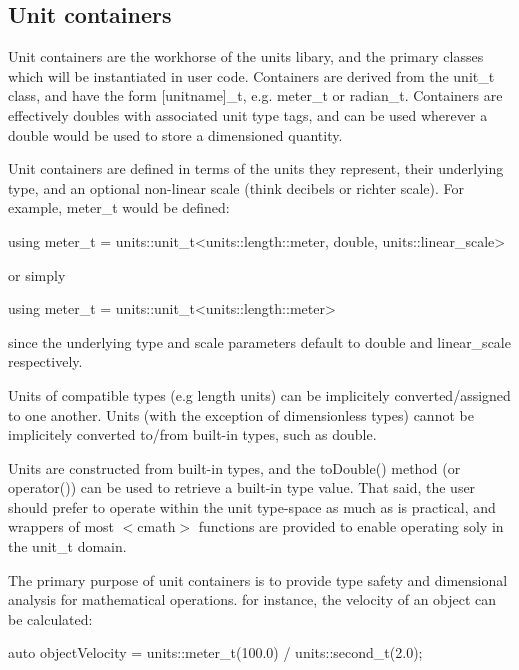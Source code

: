 \subsection*{Unit containers }

Unit containers are the workhorse of the units libary, and the primary classes which will be instantiated in user code. Containers are derived from the {\ttfamily unit\+\_\+t} class, and have the form {\ttfamily \mbox{[}unitname\mbox{]}\+\_\+t}, e.\+g. {\ttfamily meter\+\_\+t} or {\ttfamily radian\+\_\+t}. Containers are effectively doubles with associated unit type tags, and can be used wherever a double would be used to store a dimensioned quantity.

Unit containers are defined in terms of the units they represent, their underlying type, and an optional non-\/linear scale (think decibels or richter scale). For example, {\ttfamily meter\+\_\+t} would be defined\+: \begin{DoxyVerb}using meter_t = units::unit_t<units::length::meter, double, units::linear_scale>
\end{DoxyVerb}


or simply \begin{DoxyVerb}using meter_t = units::unit_t<units::length::meter>
\end{DoxyVerb}


since the underlying type and scale parameters default to {\ttfamily double} and {\ttfamily linear\+\_\+scale} respectively.

Units of compatible types (e.\+g length units) can be implicitely converted/assigned to one another. Units (with the exception of dimensionless types) cannot be implicitely converted to/from built-\/in types, such as {\ttfamily double}.

Units are constructed from built-\/in types, and the {\ttfamily to\+Double()} method (or {\ttfamily operator()}) can be used to retrieve a built-\/in type value. That said, the user should prefer to operate within the unit type-\/space as much as is practical, and wrappers of most {\ttfamily $<$cmath$>$} functions are provided to enable operating soly in the {\ttfamily unit\+\_\+t} domain.

The primary purpose of unit containers is to provide type safety and dimensional analysis for mathematical operations. for instance, the velocity of an object can be calculated\+: \begin{DoxyVerb}auto objectVelocity = units::meter_t(100.0) / units::second_t(2.0);
\end{DoxyVerb}


